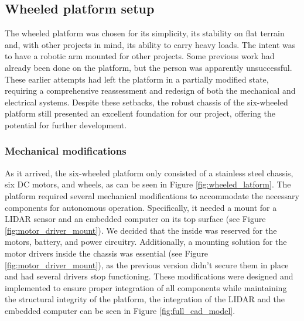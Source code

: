 \documentclass[12pt]{article}
\begin{document}

    \subsection{Wheeled platform setup}

        The wheeled platform was chosen for its simplicity, its stability on flat terrain and, with other projects in mind, its ability to carry heavy loads. The intent was to have a robotic arm mounted for other projects. Some previous work had already been done on the platform, but the person was apparently unsuccessful. These earlier attempts had left the platform in a partially modified state, requiring a comprehensive reassessment and redesign of both the mechanical and electrical systems. Despite these setbacks, the robust chassis of the six-wheeled platform still presented an excellent foundation for our project, offering the potential for further development.

        \subsubsection{Mechanical modifications}
        As it arrived, the six-wheeled platform only consisted of a stainless steel chassis, six DC motors, and wheels, as can be seen in Figure \ref{fig:wheeled_latform}. The platform required several mechanical modifications to accommodate the necessary components for autonomous operation. Specifically, it needed a mount for a LIDAR sensor and an embedded computer on its top surface (see Figure \ref{fig:motor_driver_mount}). We decided that the inside was reserved for the motors, battery, and power circuitry. Additionally, a mounting solution for the motor drivers inside the chassis was essential (see Figure \ref{fig:motor_driver_mount}), as the previous version didn't secure them in place and had several drivers stop functioning. These modifications were designed and implemented to ensure proper integration of all components while maintaining the structural integrity of the platform, the integration of the LIDAR and the embedded computer can be seen in Figure \ref{fig:full_cad_model}.
        
\end{document}
